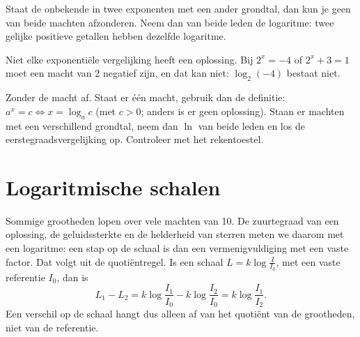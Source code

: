 \begin{oefeningen}
\end{oefeningen}

Staat de onbekende in twee exponenten met een ander grondtal, dan kun je geen van beide machten afzonderen. Neem dan van beide leden de logaritme: twee gelijke positieve getallen hebben dezelfde logaritme.


Niet elke exponentiële vergelijking heeft een oplossing. Bij $2^x = -4$ of $2^x + 3 = 1$ moet een macht van 2 negatief zijn, en dat kan niet: $\log_2(-4)$ bestaat niet.

\begin{werkwijze}
Zonder de macht af. Staat er één macht, gebruik dan de definitie: $a^x = c \iff x = \log_a c$ (met $c > 0$; anders is er geen oplossing). Staan er machten met een verschillend grondtal, neem dan $\ln$ van beide leden en los de eerstegraadsvergelijking op. Controleer met het rekentoestel.
\end{werkwijze}

\begin{oefeningen}
\end{oefeningen}

\section{Logaritmische schalen}

Sommige grootheden lopen over vele machten van 10. De zuurtegraad van een oplossing, de geluidssterkte en de helderheid van sterren meten we daarom met een logaritme: een stap op de schaal is dan een vermenigvuldiging met een vaste factor. Dat volgt uit de quotiëntregel. Is een schaal $L = k \log \frac{I}{I_0}$, met een vaste referentie $I_0$, dan is
\[L_1 - L_2 = k \log \frac{I_1}{I_0} - k \log \frac{I_2}{I_0} = k \log \frac{I_1}{I_2} .\]
Een verschil op de schaal hangt dus alleen af van het quotiënt van de grootheden, niet van de referentie.

